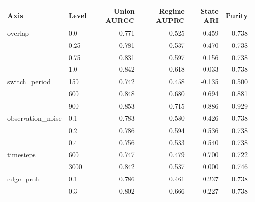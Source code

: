 \begin{tabular}{llrrrr}
\toprule
Axis & Level & Union AUROC & Regime AUPRC & State ARI & Purity \\
\midrule
overlap & 0.0 & 0.771 & 0.525 & 0.459 & 0.738 \\
 & 0.25 & 0.781 & 0.537 & 0.470 & 0.738 \\
 & 0.75 & 0.831 & 0.597 & 0.156 & 0.738 \\
 & 1.0 & 0.842 & 0.618 & -0.033 & 0.738 \\
\midrule
switch\_period & 150 & 0.742 & 0.458 & -0.135 & 0.500 \\
 & 600 & 0.848 & 0.680 & 0.694 & 0.881 \\
 & 900 & 0.853 & 0.715 & 0.886 & 0.929 \\
\midrule
observation\_noise & 0.1 & 0.783 & 0.580 & 0.426 & 0.738 \\
 & 0.2 & 0.786 & 0.594 & 0.536 & 0.738 \\
 & 0.4 & 0.756 & 0.533 & 0.540 & 0.738 \\
\midrule
timesteps & 600 & 0.747 & 0.479 & 0.700 & 0.722 \\
 & 3000 & 0.842 & 0.537 & 0.000 & 0.746 \\
\midrule
edge\_prob & 0.1 & 0.786 & 0.461 & 0.237 & 0.738 \\
 & 0.3 & 0.802 & 0.666 & 0.227 & 0.738 \\
\bottomrule
\end{tabular}
